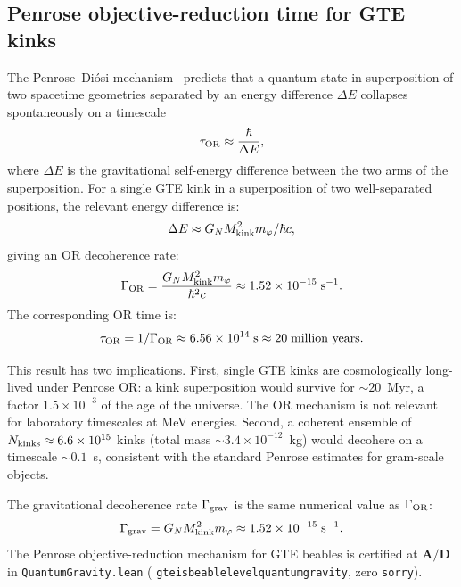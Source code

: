 \documentclass[11pt]{article}
\theoremstyle{remark}
\newcommand{\lean}[1]{%
  \penalty-100
  \begingroup\def\_{\textunderscore\allowbreak}\texttt{#1}\endgroup}
\newcommand{\Mkink}{M_{\rm kink}}
\newcommand{\CatAD}{\textbf{A/D}}
\newcommand{\GN}{G_N}
\begin{document}
\subsection{Penrose objective-reduction time for GTE kinks}
\label{ssec:penrose}

The Penrose--Di\'{o}si mechanism~\cite{Penrose1994} predicts that a quantum state
in superposition of two spacetime geometries separated by an energy difference
$\Delta E$ collapses spontaneously on a timescale
\begin{equation}
  \tau_{\rm OR} \approx \frac{\hbar}{\Delta E},
\label{eq:tau_OR}
\end{equation}
where $\Delta E$ is the gravitational self-energy difference between the two arms
of the superposition.
For a single GTE kink in a superposition of two well-separated positions, the
relevant energy difference is:
\begin{equation}
  \Delta E \approx \GN\Mkink^2 m_\varphi / \hbar c,
\label{eq:deltaE}
\end{equation}
giving an OR decoherence rate:
\begin{equation}
  \Gamma_{\rm OR} = \frac{\GN\Mkink^2 m_\varphi}{\hbar^2 c}
  \approx 1.52\times10^{-15}\;\text{s}^{-1}.
\label{eq:gamma_OR}
\end{equation}
The corresponding OR time is:
\begin{equation}
  \tau_{\rm OR} = 1/\Gamma_{\rm OR} \approx 6.56\times10^{14}\;\text{s}
  \approx 20\;\text{million years}.
\label{eq:tau_OR_val}
\end{equation}

This result has two implications.
First, single GTE kinks are cosmologically long-lived under Penrose OR: a kink
superposition would survive for $\sim20$~Myr, a factor $1.5\times10^{-3}$ of
the age of the universe.
The OR mechanism is not relevant for laboratory timescales at MeV energies.
Second, a coherent ensemble of $N_{\rm kinks} \approx 6.6\times10^{15}$ kinks
(total mass $\sim 3.4\times10^{-12}$~kg) would decohere on a timescale
$\sim 0.1$~s, consistent with the standard Penrose estimates for
gram-scale objects.

The gravitational decoherence rate $\Gamma_{\rm grav}$ is the same numerical value
as $\Gamma_{\rm OR}$:
\begin{equation}
  \Gamma_{\rm grav} = \GN\Mkink^2 m_\varphi
  \approx 1.52\times10^{-15}\;\text{s}^{-1}.
\label{eq:gamma_grav}
\end{equation}
The Penrose objective-reduction mechanism for GTE beables is certified at $\CatAD$
in \lean{QuantumGravity.lean} (\lean{gte\_is\_beable\_level\_quantum\_gravity},
zero \texttt{sorry}).
\end{document}
